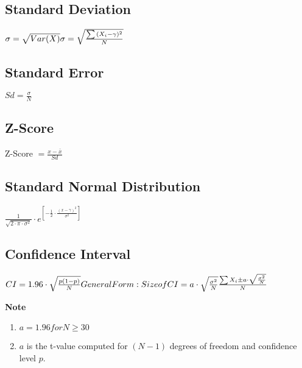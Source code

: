 \documentclass[landscape]{article}
\begin{document}
		\subsection{Standard Deviation}
		\(\sigma = \sqrt{Var(X)}\newline
			\sigma = \sqrt{\frac{\sum{(X_i - \gamma)^2}}{N}}\)\newline

		\subsection{Standard Error}
		\(Sd = \frac{\sigma}{N}\)

		\subsection{Z-Score}
		Z-Score \(= \frac{x - \bar{x}}{Sd}\)

		\subsection{Standard Normal Distribution}
		\(\frac{1}{\sqrt{2 \cdot \pi \cdot \sigma^2}} \cdot e^{[-\frac{1}{2} \cdot \frac{(x-\gamma)^2}{\sigma^2}]}\)

		\subsection{Confidence Interval}
		\(CI = 1.96 \cdot \sqrt{\frac{p(1 - p)}{N}}\newline
			General Form:\newline
			Size of CI = a \cdot \sqrt{\frac{\sigma^2}{N}}\newline
			\frac{\sum{X_i \pm a \cdot \sqrt{\frac{\sigma^2}{N}}}}{N}\)

			\textbf{Note}

			\begin{enumerate}
			\item $a = 1.96 for N \geq 30$
			\item $a$ is the t-value computed for $(N - 1)$ degrees of freedom and confidence level $p$.
			\end{enumerate}
\end{document}
